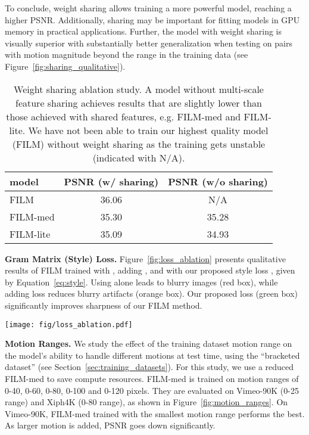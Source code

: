 \documentclass[runningheads]{llncs}
\begin{document}
To conclude, weight sharing allows training a more powerful model, reaching a higher PSNR. Additionally, sharing may be important for fitting models in GPU memory in practical applications. Further, the model with weight sharing is visually superior with substantially better generalization when testing on pairs with motion magnitude beyond the range in the training data (see Figure~\ref{fig:sharing_qualitative}).

\begin{table}
    \centering
    \begin{tabular}{l|c|c|}
    \bf{model} & \bf{PSNR (w/ sharing)} & \bf {PSNR (w/o sharing)} \\
    \hline
    FILM                &  36.06 & N/A \\
    FILM-med            &  35.30 & 35.28 \\
    FILM-lite           &  35.09 & 34.93 \\
    \end{tabular}
    \caption{Weight sharing ablation study. A model without multi-scale feature sharing achieves results that are slightly lower than those achieved with shared features, e.g. FILM-med and FILM-lite. We have not been able to train our highest quality model (FILM) without weight sharing as the training gets unstable (indicated with N/A).}
    \label{tab:my_label}
    \vspace{-6ex}
\end{table}
    
\noindent\textbf{Gram Matrix (Style) Loss.} Figure~\ref{fig:loss_ablation} presents qualitative results of FILM trained with , adding , and with our proposed style loss , given by Equation~\ref{eq:style}. Using  alone leads to blurry images (red box), while adding  loss reduces blurry artifacts (orange box). Our proposed loss (green box) significantly improves sharpness of our FILM method.

\begin{figure*}[ht!]
    \centering
    \texttt{[image: fig/loss\_ablation.pdf]}
    \caption{Loss function comparison on our FILM. L1 loss (left), L1 plus VGG loss (middle), and our proposed style loss (right), showing significant sharpness improvements (green box).
    }
    \label{fig:loss_ablation}
    \vspace{-2ex}
\end{figure*}

\vspace{0.05in}
\noindent\textbf{Motion Ranges.} We study the effect of the training dataset motion range on the model's ability to handle different motions at test time, using the ``bracketed dataset'' (see Section~\ref{sec:training_datasets}). For this study, we use a reduced FILM-med to save compute resources. FILM-med is trained on motion ranges of 0-40, 0-60, 0-80, 0-100 and 0-120 pixels. They are evaluated on Vimeo-90K (0-25 range) and Xiph\-4K (0-80 range), as shown in Figure~\ref{fig:motion_ranges}.
On Vimeo-90K, FILM-med trained with the smallest motion range performs the best. As larger motion is added, PSNR goes down significantly. 
\end{document}
